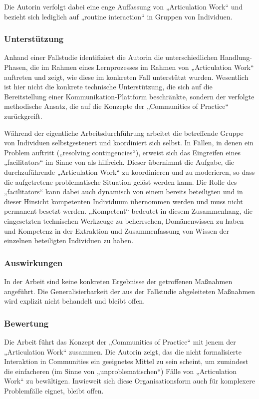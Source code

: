 Die Autorin verfolgt dabei eine enge Auffassung von „Articulation Work“ und bezieht sich lediglich auf „routine interaction“ in Gruppen von Individuen.

\subsubsection{Unterstützung}

Anhand einer Fallstudie identifiziert die Autorin die unterschiedlichen Handlung-Phasen, die im Rahmen eines Lernprozesses im Rahmen von „Articulation Work“ auftreten und zeigt, wie diese im konkreten Fall unterstützt wurden. Wesentlich ist hier nicht die konkrete technische Unterstützung, die sich auf die Bereitstellung einer Kommunikation-Plattform beschränkte, sondern der verfolgte methodische Ansatz, die auf die Konzepte der „Communities of Practice“ zurückgreift.

Während der eigentliche Arbeitsdurchführung arbeitet die betreffende Gruppe von Individuen selbstgesteuert und koordiniert sich selbst. In Fällen, in denen ein Problem auftritt („resolving contingencies“), erweist sich das Eingreifen eines „facilitators“ im Sinne von \citet{Wenger99} als hilfreich. Dieser übernimmt die Aufgabe, die durchzuführende „Articulation Work“ zu koordinieren und zu moderieren, so dass die aufgetretene problematische Situation gelöst werden kann. Die Rolle des „facilitators“ kann dabei auch dynamisch von einem bereits beteiligten und in dieser Hinsicht kompetenten Individuum übernommen werden und muss nicht permanent besetzt werden. „Kompetent“ bedeutet in diesem Zusammenhang, die eingesetzten technischen Werkzeuge zu beherrschen, Domänenwissen zu haben und Kompetenz in der Extraktion und Zusammenfassung von Wissen der einzelnen beteiligten Individuen zu haben.

\subsubsection{Auswirkungen}

In der Arbeit sind keine konkreten Ergebnisse der getroffenen Maßnahmen angeführt. Die Generalisierbarkeit der aus der Fallstudie abgeleiteten Maßnahmen wird explizit nicht behandelt und bleibt offen.

\subsubsection{Bewertung}
Die Arbeit führt das Konzept der „Communities of Practice“ mit jenem der „Articulation Work“ zusammen. Die Autorin zeigt, das die nicht formalisierte Interaktion in Communities ein geeignetes Mittel zu sein scheint, um zumindest die einfacheren (im Sinne von „unproblematischen“) Fälle von „Articulation Work“ zu bewältigen. Inwieweit sich diese Organisationsform auch für komplexere Problemfälle eignet, bleibt offen.


